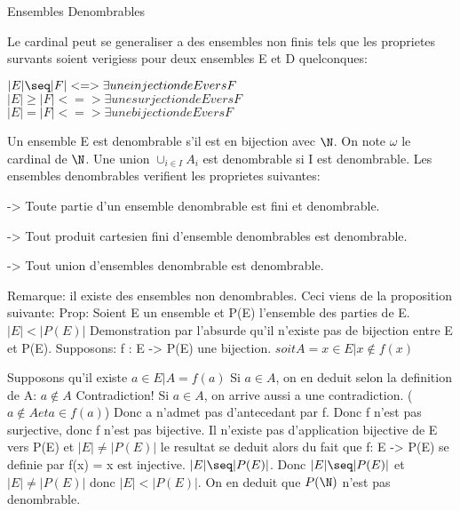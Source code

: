 \documentclass{article}
\begin{document}
Ensembles Denombrables

Le cardinal peut se generaliser a des ensembles non finis tels que les proprietes survants soient verigiess pour deux ensembles E et D quelconques:

$|E| \seq |F| <=> \exists une injection de E vers F$
$|E| \geq |F| <=> \exists une surjection de E vers F$
$|E| = |F| <=> \exists une bijection de E vers F$

Un ensemble E est denombrable s'il est en bijection avec $\N$. On note $\omega$ le cardinal de $\N$.
Une union $\cup_{i \in I} A_i$ est denombrable si I est denombrable.
Les ensembles denombrables verifient les proprietes suivantes:

-> Toute partie d'un ensemble denombrable est fini et denombrable.

-> Tout produit cartesien fini d'ensemble denombrables est denombrable.

-> Tout union d'ensembles denombrable est denombrable.


Remarque: il existe des ensembles non denombrables. Ceci viens de la proposition suivante:
Prop: Soient E un ensemble et P(E) l'ensemble des parties de E.$|E| < |P(E)|$
Demonstration par l'absurde qu'il n'existe pas de bijection entre E et P(E). Supposons:
f : E -> P(E) une bijection.
$soit A={x \in E | x \not\in f(x)}$

Supposons qu'il existe $a \in E | A=f(a)$
Si $a \in A$, on en deduit selon la definition de A: $a \not\in A$ Contradiction!
Si $a \in A$, on arrive aussi a une contradiction. ($a \not\in A et a \in f(a)$)
Donc a n'admet pas d'antecedant par f. Donc f n'est pas surjective, donc f n'est pas bijective.
Il n'existe pas d'application bijective de E vers P(E) et $|E| \ne |P(E)|$ le resultat se deduit alors du fait que f: E -> P(E) se definie par f(x) = {x} est injective. $|E| \seq |P(E)|$.
Donc $|E| \seq |P(E)|$ et $|E| \neq |P(E)|$ donc $|E| < |P(E)|$.
On en deduit que $P(\N)$ n'est pas denombrable.
\end{document}
